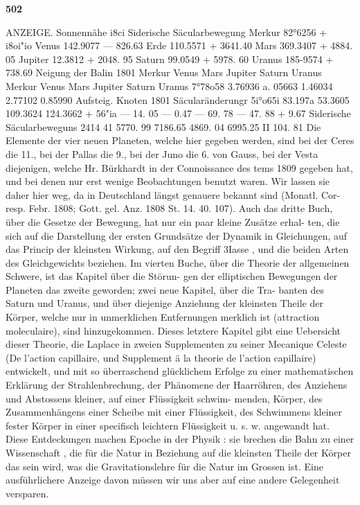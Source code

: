 \documentclass[12pt,a4paper]{article}
\begin{document}
\vspace{0.5em}


\noindent\textbf{502}

ANZEIGE. Sonnennähe  i8ci Siderische Säcularbewegung Merkur 82°6256 +  i8oi"io Venus 142.9077 ---   826.63 Erde 110.5571 +  3641.40 Mars 369.3407 +  4884.  05 Jupiter 12.3812 +  2048.  95 Saturn 99.0549 +  5978.  60 Uranus 185-9574 +    738.69 Neigung  der  Balin 1801 Merkur Venus Mars Jupiter Saturn Uranus Merkur Venus Mars Jupiter Saturn Uranus 7°78o58 3.76936 a.  05663 1.46034 2.77102 0.85990 Aufsteig.  Knoten 1801 Säcularänderungr 5i°o65i 83.197a 53.3605 109.3624 124.3662 +  56"ia ---  14.  05 ---  0.47 ---  69.  78 ---  47.  88 +  9.67 Siderische Säcularbeweguns 2414  41 5770. 99 7186.65 4869.  04 6995.25 II 104.  81 Die  Elemente  der  vier  neuen  Planeten,  welche  hier  gegeben  werden,  sind  bei  der  Ceres  die  11., bei  der  Pallas  die  9.,  bei  der  Juno  die  6.  von  Gauss,  bei  der  Vesta  diejenigen,  welche  Hr.  Bürkhardt in  der  Connoissance  des  tems  1809  gegeben  hat,  und  bei  denen  nur  erst  wenige  Beobachtungen  benutzt waren.  Wir  lassen  sie  daher  hier  weg,  da  in  Deutschland  längst  genauere  bekannt  sind  (Monatl.  Cor- resp.  Febr.  1808;  Gott.  gel.  Anz.  1808  St.  14.  40.  107). Auch  das  dritte  Buch,  über  die  Gesetze  der  Bewegung,  hat  nur  ein  paar  kleine  Zusätze  erhal- ten, die  sich  auf  die  Darstellung  der  ersten  Grundsätze  der  Dynamik  in  Gleichungen,  auf  das  Princip der  kleinsten  Wirkung,  auf  den  Begriff  3Iasse ,  und  die  beiden  Arten  des  Gleichgewichts  beziehen. Im  vierten  Buche,  über  die  Theorie  der  allgemeinen  Schwere,  ist  das  Kapitel  über  die  Störun- gen der  elliptischen  Bewegungen  der  Planeten  das  zweite  geworden;  zwei  neue  Kapitel,  über  die  Tra- banten des  Saturn  und  Uranus,  und  über  diejenige  Anziehung  der  kleinsten  Theile  der  Körper,  welche nur  in  unmerklichen  Entfernungen  merklich  ist  (attraction  moleculaire),  sind  hinzugekommen.  Dieses letztere  Kapitel  gibt  eine  Uebersicht  dieser  Theorie,  die  Laplace  in  zweien  Supplementen  zu  seiner Mecanique  Celeste  (De  l'action  capillaire,  und  Supplement  ä  la  theorie  de  l'action  capillaire)  entwickelt, und  mit  so  überraschend  glücklichem  Erfolge  zu  einer  mathematischen  Erklärung  der  Strahlenbrechung, der  Phänomene  der  Haarröhren,  des  Anziehens  und  Abstossens  kleiner,  auf  einer  Flüssigkeit  schwim- menden, Körper,  des  Zusammenhängens  einer  Scheibe  mit  einer  Flüssigkeit,  des  Schwimmens  kleiner fester  Körper  in  einer  specifisch  leichtern  Flüssigkeit  u.  s.  w.  angewandt  hat.  Diese  Entdeckungen  machen Epoche  in  der  Physik :  sie  brechen  die  Bahn  zu  einer  Wissenschaft ,  die  für  die  Natur  in  Beziehung  auf die  kleinsten  Theile  der  Körper  das  sein  wird,  was  die  Gravitationslehre  für  die  Natur  im  Grossen  ist. Eine  ausführlichere  Anzeige  davon  müssen  wir  uns  aber  auf  eine  andere  Gelegenheit  versparen.
\end{document}
